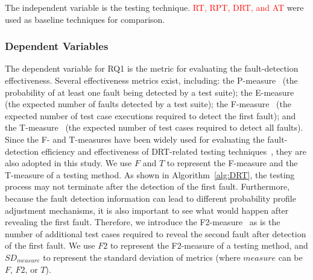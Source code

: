 \documentclass[10pt,journal,compsoc]{IEEEtran}
\begin{document}
The independent variable is the testing technique. \textcolor{red}{RT, RPT, DRT, and AT \cite{cai2004optimal}} were used as baseline techniques for comparison.

\subsubsection{Dependent Variables}
\label{sec:dependentvariables}

The dependent variable for RQ1 is the metric for evaluating the fault-detection effectiveness.
Several effectiveness metrics exist, including:
the P-measure~\cite{duran1984evaluation} (the probability of at least one fault being detected by a test suite);
the E-measure~\cite{chen1997optimal} (the expected number of faults detected by a test suite);
the F-measure~\cite{sun2018adaptive} (the expected number of test case executions required to detect the first fault); and
the T-measure~\cite{zhang2014history} (the expected number of test cases required to detect all faults).
Since the F- and T-measures have been widely used for evaluating the fault-detection efficiency and effectiveness of DRT-related testing techniques~\cite{Cai07, cai2009random, Lv2011, Yang2014Dynamic, li2015, zhang2014history}, they are also adopted in this study.
We use $F$ and $T$ to represent the F-measure and the T-measure of a testing method.
As shown in Algorithm~\ref{alg:DRT}, the testing process may not terminate after the detection of the first fault.
Furthermore, because the fault detection information can lead to different probability profile adjustment mechanisms, it is also important to see what would happen after revealing the first fault.
Therefore, we introduce the F2-measure~\cite{sun2018adaptive} as is the number of additional test cases required to reveal the second fault after detection of the first fault.
We use $F2$ to represent the F2-measure of a testing method, and $SD_{measure}$ to represent the standard deviation of metrics (where $measure$ can be $F$, $F2$, or $T$).
\end{document}
